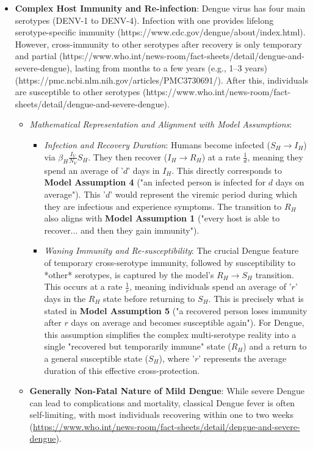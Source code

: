 \begin{itemize}
    \item \textbf{Complex Host Immunity and Re-infection}: Dengue virus has four main serotypes (DENV-1 to DENV-4). Infection with one provides lifelong serotype-specific immunity (https://www.cdc.gov/dengue/about/index.html). However, cross-immunity to other serotypes after recovery is only temporary and partial (https://www.who.int/news-room/fact-sheets/detail/dengue-and-severe-dengue), lasting from months to a few years (e.g., 1–3 years) (https://pmc.ncbi.nlm.nih.gov/articles/PMC3730691/). After this, individuals are susceptible to other serotypes (https://www.who.int/news-room/fact-sheets/detail/dengue-and-severe-dengue).
    \begin{itemize}
        \item \textit{Mathematical Representation and Alignment with Model Assumptions}:
            \begin{itemize}
                \item \textit{Infection and Recovery Duration}: Humans become infected ($S_H \rightarrow I_H$) via $\beta_H \frac{I_V}{N_V} S_H$. They then recover ($I_H \rightarrow R_H$) at a rate $\frac{1}{d}$, meaning they spend an average of '$d$' days in $I_H$. This directly corresponds to \textbf{Model Assumption 4} ("an infected person is infected for $d$ days on average"). This '$d$' would represent the viremic period during which they are infectious and experience symptoms. The transition to $R_H$ also aligns with \textbf{Model Assumption 1} ("every host is able to recover... and then they gain immunity").
                \item \textit{Waning Immunity and Re-susceptibility}: The crucial Dengue feature of temporary cross-serotype immunity, followed by susceptibility to *other* serotypes, is captured by the model's $R_H \rightarrow S_H$ transition. This occurs at a rate $\frac{1}{r}$, meaning individuals spend an average of '$r$' days in the $R_H$ state before returning to $S_H$. This is precisely what is stated in \textbf{Model Assumption 5} ("a recovered person loses immunity after $r$ days on average and becomes susceptible again"). For Dengue, this assumption simplifies the complex multi-serotype reality into a single "recovered but temporarily immune" state ($R_H$) and a return to a general susceptible state ($S_H$), where '$r$' represents the average duration of this effective cross-protection.
            \end{itemize}
        \item \textbf{Generally Non-Fatal Nature of Mild Dengue}: While severe Dengue can lead to complications and mortality, classical Dengue fever is often self-limiting, with most individuals recovering within one to two weeks (\url{https://www.who.int/news-room/fact-sheets/detail/dengue-and-severe-dengue}).

\end{itemize}
\end{itemize}
